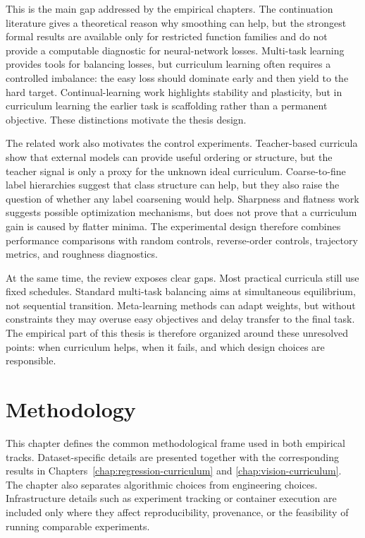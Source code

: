 \documentclass[english,master,a4paper,oneside]{ppfcmthesis}
\begin{document}
This is the main gap addressed by the empirical chapters. The continuation
literature gives a theoretical reason why smoothing can help, but the strongest
formal results are available only for restricted function families and do not
provide a computable diagnostic for neural-network losses. Multi-task learning
provides tools for balancing losses, but curriculum learning often requires a
controlled imbalance: the easy loss should dominate early and then yield to the
hard target. Continual-learning work highlights stability and plasticity, but in
curriculum learning the earlier task is scaffolding rather than a permanent
objective. These distinctions motivate the thesis design.

The related work also motivates the control experiments. Teacher-based
curricula show that external models can provide useful ordering or structure,
but the teacher signal is only a proxy for the unknown ideal curriculum.
Coarse-to-fine label hierarchies suggest that class structure can help, but they
also raise the question of whether any label coarsening would help. Sharpness
and flatness work suggests possible optimization mechanisms, but does not prove
that a curriculum gain is caused by flatter minima. The experimental design
therefore combines performance comparisons with random controls, reverse-order
controls, trajectory metrics, and roughness diagnostics.

At the same time, the review exposes clear gaps. Most practical curricula still
use fixed schedules. Standard multi-task balancing aims at simultaneous
equilibrium, not sequential transition. Meta-learning methods can adapt weights,
but without constraints they may overuse easy objectives and delay transfer to
the final task. The empirical part of this thesis is therefore organized around
these unresolved points: when curriculum helps, when it fails, and which design
choices are responsible.

\chapter{Methodology}
\label{chap:methodology}

This chapter defines the common methodological frame used in both empirical
tracks. Dataset-specific details are presented together with the corresponding
results in Chapters~\ref{chap:regression-curriculum} and
\ref{chap:vision-curriculum}. The chapter also separates algorithmic choices
from engineering choices. Infrastructure details such as experiment tracking or
container execution are included only where they affect reproducibility,
provenance, or the feasibility of running comparable experiments.
\end{document}
